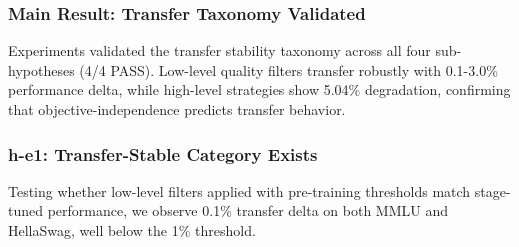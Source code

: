 
\subsubsection{Main Result: Transfer Taxonomy Validated}

Experiments validated the transfer stability taxonomy across all four sub-hypotheses (4/4 PASS). Low-level quality filters transfer robustly with 0.1-3.0\% performance delta, while high-level strategies show 5.04\% degradation, confirming that objective-independence predicts transfer behavior.

\begin{table}[htbp]
\centering
{}
\end{table}

\subsubsection{h-e1: Transfer-Stable Category Exists}

Testing whether low-level filters applied with pre-training thresholds match stage-tuned performance, we observe 0.1\% transfer delta on both MMLU and HellaSwag, well below the 1\% threshold.

\begin{table}[htbp]
\centering
{}
\end{table}

